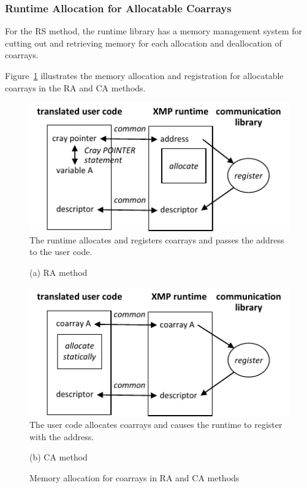 \subsubsection{Runtime Allocation for Allocatable Coarrays}

For the RS method, the runtime library has a memory management system for
cutting out and retrieving memory for each allocation and deallocation of coarrays.

Figure~\ref{fig:register-RA-CA} illustrates the memory allocation and registration
for allocatable coarrays in the RA and CA methods. 

\begin{figure}
 \begin{center}
  \includegraphics[scale=0.9, trim=0mm 0mm 0mm 0mm, clip]{figs/register-RA-tmp.pdf}\\
The runtime allocates and registers coarrays and passes the address to the user code.
 \end{center}
 \begin{center}
(a) RA method
 \end{center}
 \begin{center}
  \includegraphics[scale=0.9, trim=0mm 0mm 0mm 0mm, clip]{figs/register-CA-tmp.pdf}\\
The user code allocates coarrays and causes the runtime to register with the address.
 \end{center}
 \begin{center}
(b) CA method
 \end{center}
 \caption{Memory allocation for coarrays in RA and CA methods}
 \label{fig:register-RA-CA}
\end{figure}

